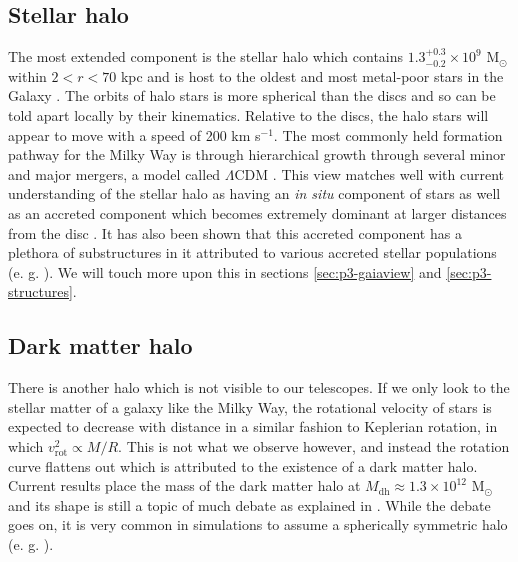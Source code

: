\subsection{Stellar halo}\label{subsec:components-stellarhalo}
The most extended component is the stellar halo which contains $1.3^{+0.3}_{-0.2} \times 10^9$ M$_\odot$ within $2 < r < 70$ kpc \citep{mackereth:20} and is host to the oldest and most metal-poor stars in the Galaxy \citep{dacosta:19, horta:22}. The orbits of halo stars is more spherical than the discs and so can be told apart locally by their kinematics. Relative to the discs, the halo stars will appear to move with a speed of 200 km s$^{-1}$. The most commonly held formation pathway for the Milky Way is through hierarchical growth through several minor and major mergers, a model called $\Lambda$CDM \citep{springel:05}. This view matches well with current understanding of the stellar halo as having an \textit{in situ} component of stars as well as an accreted component which becomes extremely dominant at larger distances from the disc \citep{naidu:20}. It has also been shown that this accreted component has a plethora of substructures in it attributed to various accreted stellar populations (e. g. \citealt{koppelman:19, feuillet:21, dodd:22}). We will touch more upon this in sections \ref{sec:p3-gaiaview} and \ref{sec:p3-structures}.

\subsection{Dark matter halo}\label{subsec:components-darkhalo}
There is another halo which is not visible to our telescopes. If we only look to the stellar matter of a galaxy like the Milky Way, the rotational velocity of stars is expected to decrease with distance in a similar fashion to Keplerian rotation, in which $v_\mathrm{rot}^2 \propto M/R$. This is not what we observe however, and instead the rotation curve flattens out which is attributed to the existence of a dark matter halo. Current results place the mass of the dark matter halo at $M_\mathrm{dh} \approx 1.3 \times 10^12$ M$_\odot$ \cite{posti:19} and its shape is still a topic of much debate as explained in \cite{mcmillan:17}. While the debate goes on, it is very common in simulations to assume a spherically symmetric halo (e. g. \citealt{andersson:20}).

